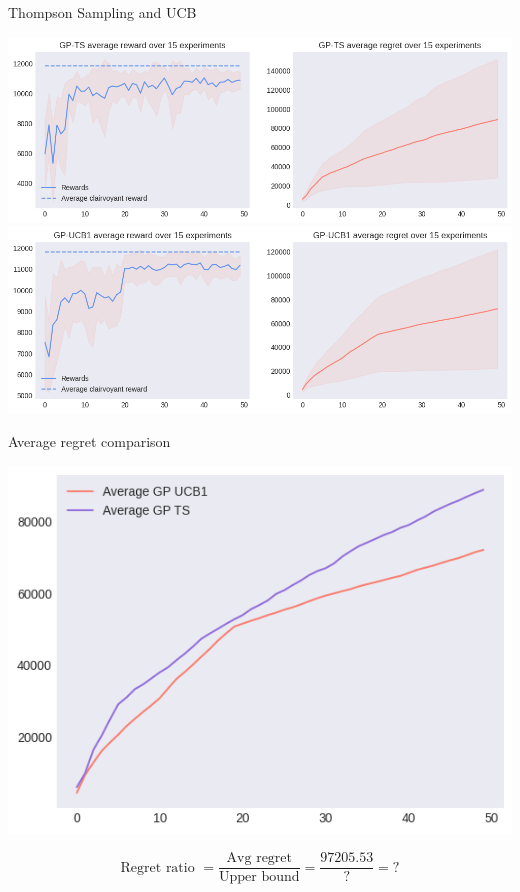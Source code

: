 Thompson Sampling and UCB

\begin{center}
	\includegraphics[scale=0.5]{img/Graphs/uncertain_alpha_unit/image4.png}
	\includegraphics[scale=0.5]{img/Graphs/uncertain_alpha_unit/image5.png}
\end{center}

Average regret comparison

\begin{center}
	\includegraphics[scale=0.5]{img/Graphs/uncertain_alpha_unit/image6.png}
\end{center}

\begin{displaymath}
	\text{Regret ratio } = \frac{\text{Avg regret}}{\text{Upper bound}} = \frac{97205.53}{?} = ?
\end{displaymath}

